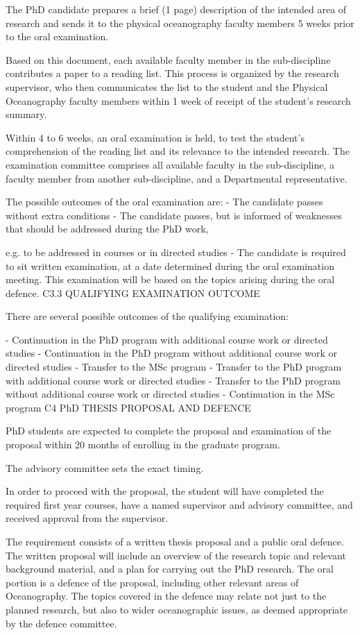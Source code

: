 \documentclass{article}
\begin{document}
The PhD candidate prepares a brief (1 page) description of the intended area of research and sends it to the physical oceanography faculty members 5 weeks prior to the oral examination.

Based on this document, each available faculty member in the sub-discipline contributes a paper to a reading list. This process is organized by the research supervisor, who then communicates the list to the student and the Physical Oceanography faculty members within 1 week of receipt of the student’s research summary.

Within 4 to 6 weeks, an oral examination is held, to test the student’s comprehension of the reading list and its relevance to the intended research. The examination committee comprises all available faculty in the sub-discipline, a faculty member from another sub-discipline, and a Departmental representative.

The possible outcomes of the oral examination are:
-	The candidate passes without extra conditions
-	The candidate passes, but is informed of weaknesses that should be addressed during the PhD work,
 

e.g. to be addressed in courses or in directed studies
-	The candidate is required to sit written examination, at a date determined during the oral examination meeting. This examination will be based on the topics arising during the oral defence.
C3.3	QUALIFYING EXAMINATION OUTCOME

There are several possible outcomes of the qualifying examination:

-	Continuation in the PhD program with additional course work or directed studies
-	Continuation in the PhD program without additional course work or directed studies
-	Transfer to the MSc program
-	Transfer to the PhD program with additional course work or directed studies
-	Transfer to the PhD program without additional course work or directed studies
-	Continuation in the MSc program
C4	PhD THESIS PROPOSAL AND DEFENCE

PhD students are expected to complete the proposal and examination of the proposal within 20 months of enrolling in the graduate program.

The advisory committee sets the exact timing.

In order to proceed with the proposal, the student will have completed the required first year courses, have a named supervisor and advisory committee, and received approval from the supervisor.

The requirement consists of a written thesis proposal and a public oral defence.  The written proposal will include an overview of the research topic and relevant background material, and a plan for carrying out the PhD research. The oral portion is a defence of the proposal, including other relevant areas of Oceanography. The topics covered in the defence may relate not just to the planned research, but also to wider oceanographic issues, as deemed appropriate by the defence committee.
\end{document}
